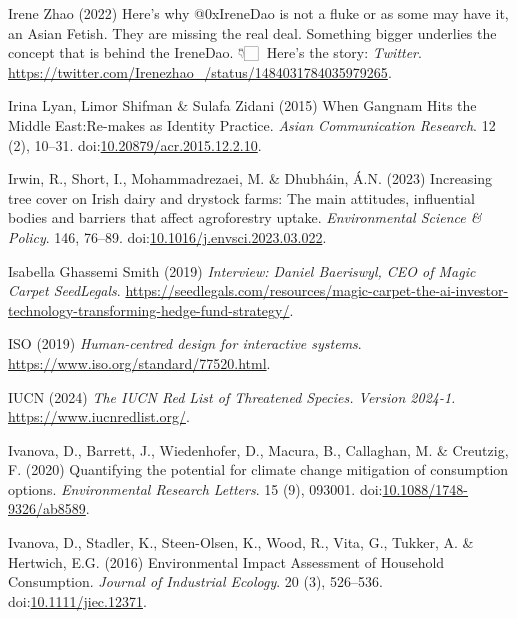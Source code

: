 \documentclass[
  letterpaper,
  DIV=11,
  numbers=noendperiod]{scrartcl}
\newlength{\cslhangindent}
\newenvironment{CSLReferences}[2] %
 {\begin{list}{}{%
  \setlength{\itemindent}{0pt}
  \setlength{\leftmargin}{0pt}
  \setlength{\parsep}{0pt}
  \ifodd #1
   \setlength{\leftmargin}{\cslhangindent}
   \setlength{\itemindent}{-1\cslhangindent}
  \fi
  \setlength{\itemsep}{#2\baselineskip}}}
 {\end{list}}
\begin{document}
\begin{CSLReferences}{0}{1}
Irene Zhao (2022) Here's why @{0xIreneDao} is not a fluke or as some may
have it, an {Asian Fetish}. {They} are missing the real deal.
{Something} bigger underlies the concept that is behind the {IreneDao}.
👇🏻🧵 {Here}'s the story: \emph{Twitter}.
\url{https://twitter.com/Irenezhao_/status/1484031784035979265}.

Irina Lyan, Limor Shifman \& Sulafa Zidani (2015) When {Gangnam Hits}
the {Middle East}:{Re-makes} as {Identity Practice}. \emph{Asian
Communication Research}. 12 (2), 10--31.
doi:\href{https://doi.org/10.20879/acr.2015.12.2.10}{10.20879/acr.2015.12.2.10}.

Irwin, R., Short, I., Mohammadrezaei, M. \& Dhubháin, Á.N. (2023)
Increasing tree cover on {Irish} dairy and drystock farms: {The} main
attitudes, influential bodies and barriers that affect agroforestry
uptake. \emph{Environmental Science \& Policy}. 146, 76--89.
doi:\href{https://doi.org/10.1016/j.envsci.2023.03.022}{10.1016/j.envsci.2023.03.022}.

Isabella Ghassemi Smith (2019) \emph{Interview: {Daniel Baeriswyl},
{CEO} of {Magic Carpet} {\textbar} {SeedLegals}}.
\url{https://seedlegals.com/resources/magic-carpet-the-ai-investor-technology-transforming-hedge-fund-strategy/}.

ISO (2019) \emph{Human-centred design for interactive systems}.
\url{https://www.iso.org/standard/77520.html}.

IUCN (2024) \emph{The {IUCN Red List} of {Threatened Species}. {Version}
2024-1.} \url{https://www.iucnredlist.org/}.

Ivanova, D., Barrett, J., Wiedenhofer, D., Macura, B., Callaghan, M. \&
Creutzig, F. (2020) Quantifying the potential for climate change
mitigation of consumption options. \emph{Environmental Research
Letters}. 15 (9), 093001.
doi:\href{https://doi.org/10.1088/1748-9326/ab8589}{10.1088/1748-9326/ab8589}.

Ivanova, D., Stadler, K., Steen-Olsen, K., Wood, R., Vita, G., Tukker,
A. \& Hertwich, E.G. (2016) Environmental {Impact Assessment} of
{Household Consumption}. \emph{Journal of Industrial Ecology}. 20 (3),
526--536.
doi:\href{https://doi.org/10.1111/jiec.12371}{10.1111/jiec.12371}.


\end{CSLReferences}
\end{document}
